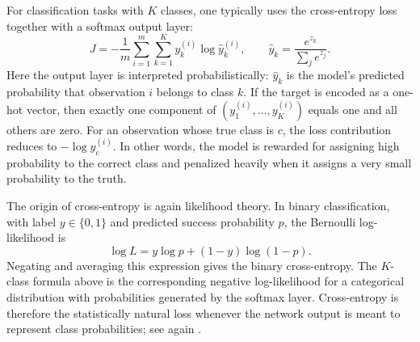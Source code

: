 \documentclass[11pt,a4paper]{report}
\begin{document}
For classification tasks with $K$ classes, one typically uses the cross-entropy loss together with a softmax output layer:
\begin{equation}
J = -\frac{1}{m}\sum_{i=1}^{m}\sum_{k=1}^{K} y_k^{(i)}\log \hat{y}_k^{(i)},
\qquad \hat{y}_k = \frac{e^{z_k}}{\sum_{j} e^{z_j}}.
\end{equation}
Here the output layer is interpreted probabilistically: $\hat{y}_k$ is the model's predicted probability that observation $i$ belongs to class $k$.  If the target is encoded as a one-hot vector, then exactly one component of $(y_1^{(i)},\dots,y_K^{(i)})$ equals one and all others are zero.  For an observation whose true class is $c$, the loss contribution reduces to $-\log \hat{y}_c^{(i)}$.  In other words, the model is rewarded for assigning high probability to the correct class and penalized heavily when it assigns a very small probability to the truth.

The origin of cross-entropy is again likelihood theory.  In binary classification, with label $y \in \{0,1\}$ and predicted success probability $p$, the Bernoulli log-likelihood is
\begin{equation*}
\log L = y \log p + (1-y)\log(1-p).
\end{equation*}
Negating and averaging this expression gives the binary cross-entropy.  The $K$-class formula above is the corresponding negative log-likelihood for a categorical distribution with probabilities generated by the softmax layer.  Cross-entropy is therefore the statistically natural loss whenever the network output is meant to represent class probabilities; see again \citet{bishop2006, deisenroth2020mathematics}.
\end{document}
